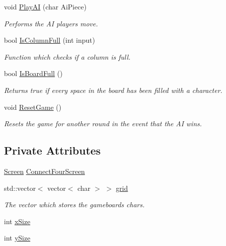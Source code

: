 \begin{DoxyCompactItemize}
\item 
void \hyperlink{classConnectFour_a618f3caa7db76bc8b4832a2338967a5b}{Play\-A\-I} (char Ai\-Piece)
\begin{DoxyCompactList}\small\item\em Performs the A\-I players move. \end{DoxyCompactList}\item 
bool \hyperlink{classConnectFour_a26d75c9c50d6424df11de765086edc8a}{Is\-Column\-Full} (int input)
\begin{DoxyCompactList}\small\item\em Function which checks if a column is full. \end{DoxyCompactList}\item 
bool \hyperlink{classConnectFour_a408b2a0222e08488c258e4225ba5b8f6}{Is\-Board\-Full} ()
\begin{DoxyCompactList}\small\item\em Returns true if every space in the board has been filled with a character. \end{DoxyCompactList}\item 
void \hyperlink{classConnectFour_aa563db9c04480dc44a37df28d07c776c}{Reset\-Game} ()
\begin{DoxyCompactList}\small\item\em Resets the game for another round in the event that the A\-I wins. \end{DoxyCompactList}\end{DoxyCompactItemize}
\subsection*{Private Attributes}
\begin{DoxyCompactItemize}
\item 
\hyperlink{classScreen}{Screen} \hyperlink{classConnectFour_a7548207e4c83260233e8d3668ae3e7e2}{Connect\-Four\-Screen}
\item 
std\-::vector$<$ vector$<$ char $>$ $>$ \hyperlink{classConnectFour_add9742cf2d2ffd9524d454762dbd3154}{grid}
\begin{DoxyCompactList}\small\item\em The vector which stores the gameboards chars. \end{DoxyCompactList}\item 
int \hyperlink{classConnectFour_a9ebcc46eaaac1805eab8b90925f83a63}{x\-Size}
\item 
int \hyperlink{classConnectFour_acd39fbfa19a81ab05e7aae3ac51e9ed8}{y\-Size}
\end{DoxyCompactItemize}


